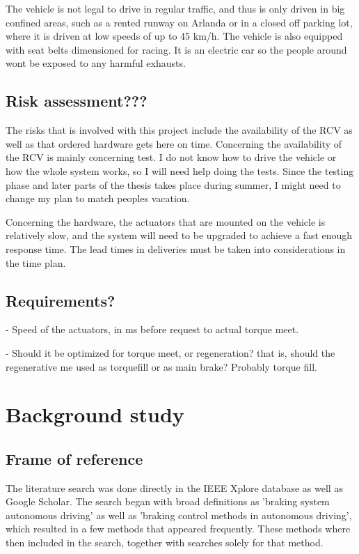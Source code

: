 \documentclass[a4paper,11pt]{kth-mag}
\begin{document}
The vehicle is not legal to drive in regular traffic, and thus is only driven in big confined areas, such as a rented runway on Arlanda or in a closed off parking lot, where it is driven at low speeds of up to 45 km/h. The vehicle is also equipped with seat belts dimensioned for racing. 
It is an electric car so the people around wont be exposed to any harmful exhausts. 


\section{Risk assessment???}
The risks that is involved with this project include the availability of the RCV as well as that ordered hardware gets here on time. Concerning the availability of the RCV is mainly concerning test. I do not know how to drive the vehicle or how the whole system works, so I will need help doing the tests. Since the testing phase and later parts of the thesis takes place during summer, I might need to change my plan to match peoples vacation. \newline

Concerning the hardware, the actuators that are mounted on the vehicle is relatively slow, and the system will need to be upgraded to achieve a fast enough response time. The lead times in deliveries must be taken into considerations in the time plan.

\section{Requirements?}

- Speed of the actuators, in ms before request to actual torque meet.

- Should it be optimized for torque meet, or regeneration? that is, should the regenerative me used as torquefill or as main brake? Probably torque fill.


\chapter{Background study}
\section{Frame of reference}
The literature search was done directly in the IEEE Xplore database as well as Google Scholar. The search began with broad definitions as 'braking system autonomous driving' as well as 'braking control methods in autonomous driving', which resulted in a few methods that appeared frequently. These methods where then included in the search, together with searches solely for that method.
\end{document}
